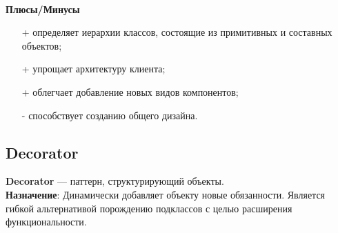 \documentclass[a3paper,11pt]{report}
\begin{document}
\textbf{\\Плюсы/Минусы}
\begin{itemize}
\item [+] определяет иерархии классов, состоящие из примитивных и составных объектов;
\item [+] упрощает архитектуру клиента;
\item [+] облегчает добавление новых видов компонентов;
\item [-] способствует созданию общего дизайна.
\end{itemize}
\newpage
\subsection{Decorator}

\large\textbf{Decorator} --- паттерн, структурирующий объекты.
\\
\large\textbf{Назначение}: Динамически добавляет объекту новые обязанности. Является гибкой альтернативой порождению подклассов с целью расширения функциональности.
\\
\end{document}
